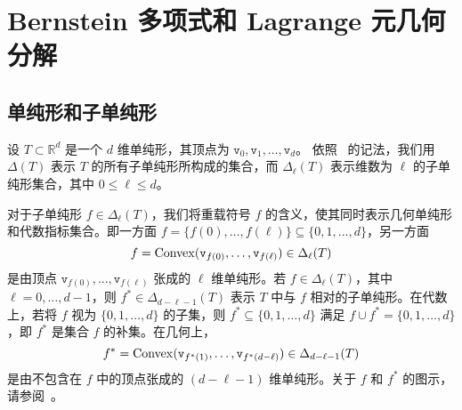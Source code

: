 \chapter{Bernstein 多项式和 Lagrange 元几何分解}


\section{单纯形和子单纯形}
设 $T \subset \mathbb{R}^{d}$ 是一个 $d$ 维单纯形，其顶点为 $\texttt{v}_{0}, \texttt{v}_{1}, \ldots, \texttt{v}_{d}$。
依照~\cite{ArnoldFalkWinther2009} 的记法，我们用 $\Delta(T)$ 表示 $T$ 的所有子单纯形所构成的集合，而 $\Delta_{\ell}(T)$ 表示维数为 $\ell$ 的子单纯形集合，其中 $0\leq \ell \leq d$。

对于子单纯形 $f\in \Delta_{\ell}(T)$，我们将重载符号 $f$ 的含义，使其同时表示几何单纯形和代数指标集合。即一方面 $f = \{f(0), \ldots, f(\ell)\}\subseteq \{0, 1, \ldots, d\}$，另一方面
\[
f ={\rm Convex}(\texttt{v}_{f(0)}, \ldots, \texttt{v}_{f(\ell)}) \in \Delta_{\ell}(T)
\]
是由顶点 $\texttt{v}_{f(0)}, \ldots, \texttt{v}_{f( \ell)}$ 张成的 $\ell$ 维单纯形。若 $f \in \Delta_{\ell}(T)$，其中 $\ell = 0, \ldots, d-1$，则 $f^{*} \in \Delta_{d- \ell-1}(T)$ 表示 $T$ 中与 $f$ 相对的子单纯形。在代数上，若将 $f$ 视为 $\{0, 1, \ldots, d\}$ 的子集，则 $f^*\subseteq \{0,1, \ldots, d\}$ 满足 $f\cup f^* = \{0, 1, \ldots, d\}$，即 $f^*$ 是集合 $f$ 的补集。在几何上，
\[
f^* ={\rm Convex}(\texttt{v}_{f^*(1)}, \ldots, \texttt{v}_{f^*(d-\ell)}) \in \Delta_{d- \ell-1}(T)
\]
是由不包含在 $f$ 中的顶点张成的 $(d- \ell-1)$ 维单纯形。关于 $f$ 和 $f^*$ 的图示，请参阅~\cite[Fig. 2]{Chen;Huang:2022FEMcomplex3D}。

